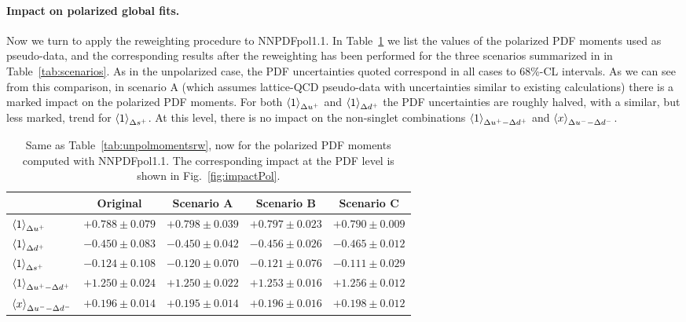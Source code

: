 \paragraph{Impact on polarized global fits.}
%
Now we turn to apply the reweighting procedure to NNPDFpol1.1.
%
In Table~\ref{tab:polmomentsrw}
we list the values of the polarized PDF moments
used as pseudo-data, and the corresponding results
after the reweighting has been performed for the
three scenarios summarized in 
in Table~\ref{tab:scenarios}.
%
As in the unpolarized case, the PDF uncertainties quoted correspond in 
all cases to 68\%-CL intervals.
%
As we can see from this comparison, in scenario A
(which assumes lattice-QCD pseudo-data with uncertainties similar
to existing calculations) there is a marked impact on the
polarized PDF moments.
%
For both $\left\langle 1\right\rangle_{\Delta u^+}$ and $\left\langle 1\right\rangle_{\Delta d^+}$
the PDF uncertainties are roughly halved, with a similar, but less marked,
trend for $\left\langle 1\right\rangle_{\Delta s^+}$.
%
At this level, there is no impact on the non-singlet
combinations $\left\langle 1\right\rangle_{\Delta u^+ - \Delta d^+}$
and $\left\langle x\right\rangle_{\Delta u^--\Delta d^-}$.

\begin{table}[!t]
\centering
\footnotesize
\renewcommand{\arraystretch}{1.4} 
\begin{tabular}{lcccc}
\toprule
& Original & Scenario A &  Scenario B & Scenario C \\
\midrule
$\left\langle 1\right\rangle_{\Delta u^+}$    
& $+0.788 \pm 0.079$   
& $+0.798 \pm 0.039$     
& $+0.797 \pm 0.023$ 
& $+0.790 \pm 0.009$ \\
$\left\langle 1\right\rangle_{\Delta d^+}$   
& $-0.450 \pm 0.083$  
& $-0.450 \pm 0.042$  
& $-0.456 \pm 0.026$    
& $-0.465 \pm 0.012$ \\
$\left\langle 1\right\rangle_{\Delta s^+}$    
& $-0.124 \pm 0.108$  
& $-0.120 \pm 0.070$  
& $-0.121 \pm 0.076$    
& $-0.111 \pm 0.029$ \\
$\left\langle 1\right\rangle_{\Delta u^+ - \Delta d^+}$  
& $+1.250 \pm 0.024$   
& $+1.250 \pm 0.022$  
& $+1.253 \pm 0.016$ 
& $+1.256 \pm 0.012$ \\
$\left\langle x\right\rangle_{\Delta u^--\Delta d^-}$     
& $+0.196 \pm 0.014$    
& $+0.195 \pm 0.014$
& $+0.196 \pm 0.016$     
& $+0.198 \pm 0.012$ \\
\bottomrule
\end{tabular}
\caption{\small Same as Table~\ref{tab:unpolmomentsrw}, now for
  the polarized PDF moments computed with NNPDFpol1.1.
  The corresponding impact at the PDF level is shown in
  Fig.~\ref{fig:impactPol}.
\label{tab:polmomentsrw}
}
\end{table}

